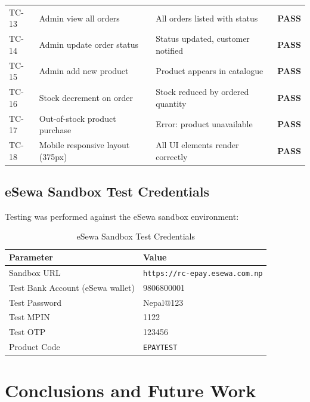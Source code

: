 \documentclass[12pt,a4paper]{report}
\begin{document}
\begin{longtable}{@{}llll@{}}
TC-13 & Admin view all orders                & All orders listed with status     & \textcolor{GreenPrimary}{\textbf{PASS}} \\
TC-14 & Admin update order status            & Status updated, customer notified & \textcolor{GreenPrimary}{\textbf{PASS}} \\
TC-15 & Admin add new product                & Product appears in catalogue      & \textcolor{GreenPrimary}{\textbf{PASS}} \\
TC-16 & Stock decrement on order             & Stock reduced by ordered quantity & \textcolor{GreenPrimary}{\textbf{PASS}} \\
TC-17 & Out-of-stock product purchase        & Error: product unavailable        & \textcolor{GreenPrimary}{\textbf{PASS}} \\
TC-18 & Mobile responsive layout (375px)     & All UI elements render correctly  & \textcolor{GreenPrimary}{\textbf{PASS}} \\
\bottomrule
\end{longtable}

\section{eSewa Sandbox Test Credentials}

Testing was performed against the eSewa sandbox environment:

\begin{table}[H]
\centering
\caption{eSewa Sandbox Test Credentials}
\begin{tabular}{@{}ll@{}}
\toprule
\textbf{Parameter}       & \textbf{Value} \\
\midrule
Sandbox URL              & \texttt{https://rc-epay.esewa.com.np} \\
Test Bank Account (eSewa wallet) & 9806800001 \\
Test Password            & Nepal@123 \\
Test MPIN                & 1122 \\
Test OTP                 & 123456 \\
Product Code             & \texttt{EPAYTEST} \\
\bottomrule
\end{tabular}
\end{table}

\chapter{Conclusions and Future Work}
\end{document}

